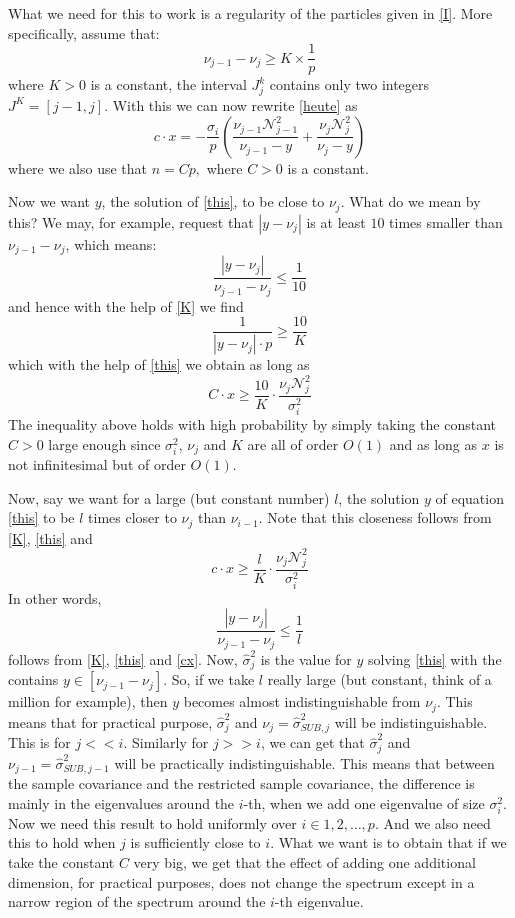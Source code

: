 \documentclass[12pt]{amsart}
\theoremstyle{definition}
\numberwithin{equation}{section}
\numberwithin{equation}{section}
\theoremstyle{remark}
\numberwithin{equation}{section}
\begin{document}
What we need for this to work is a regularity of the particles given in \ref{I}. More specifically, assume that:
\begin{equation}
\label{K}
\nu_{j-1}-\nu_{j}\geq K\times\frac{1}{p}
\end{equation}
where $K>0$ is a constant, the interval $J^k_j$ contains only two integers
$J^K=[j-1,j]$. With this we can now rewrite \ref{heute}
as
\begin{equation}
\label{this}
c \cdot x=-
\frac{\sigma_i}{p} \left( \frac{\nu_{j-1}\mathcal{N}^2_{j-1}}{\nu_{j-1}-y}+\frac{\nu_{j}\mathcal{N}^2_{j}}{\nu_{j}-y}\right)
\end{equation}
where we also use that $n=C\dot p,$ where $C>0$ is a constant.

Now we want $y$, the solution of \ref{this}, to be close to $\nu_j$.
What do we mean by this? We may, for example, request that
$|y-\nu_j| $ is at least $10$  times smaller than $\nu_{j-1}-\nu_j$, which means:
$$\frac{|y-\nu_j|}{\nu_{j-1}-\nu_j}\leq  \frac{1}{10}$$
and hence with the help of \ref{K} we find
$$\frac{1}{|y-\nu_j|\cdot p}\geq  \frac{10}{K}$$
which with the help of \ref{this} we obtain
as long as
$$C\cdot x \geq \frac{10}{K}\cdot \frac{\nu_{j}\mathcal{N}^2_{j}}{\sigma_i^2}$$
The inequality above holds with high probability by simply taking the constant $C>0$ large enough since $\sigma_i^2$, $\nu_j$ and $K$ are all of order $O(1)$ and as long as $x$ is not infinitesimal but of order $O(1)$.

Now, say we want for a large (but constant number) $l$, the solution $y$ of equation \ref{this} to be $l$ times closer to $\nu_j$ than $\nu_{i-1}$. Note that this closeness follows from \ref{K}, \ref{this} and
\begin{equation}
\label{cx}
c\cdot x \geq \frac{l}{K}\cdot \frac{\nu_{j}\mathcal{N}^2_{j}}{\sigma_i^2}
\end{equation}
In other words,
\begin{equation}
\label{l}
\frac{|y-\nu_j|}{\nu_{j-1}-\nu_j}\leq  \frac{1}{l}
\end{equation} follows from
\ref{K}, \ref{this} and \ref{cx}. Now, $\hat{\sigma}^2_j$ is the value for $y$ solving
\ref{this} with the contains $y\in[\nu_{j-1}-\nu_j]$. So, if we take $l$ really large (but constant, think
of a million for example), then $y$ becomes almost indistinguishable from $\nu_j$. This means that for practical purpose, $\hat{\sigma}^2_j$ and $\nu_j=\hat{\sigma}^2_{SUB,j}$ will be indistinguishable. This is for $j<<i$.  Similarly for $j>>i$, we can get that $\hat{\sigma}^2_j$ and $\nu_{j-1}=\hat{\sigma}^2_{SUB,j-1}$ will be practically indistinguishable. This means that between the sample covariance and the restricted sample covariance, the difference is mainly in the eigenvalues around the $i$-th, when we add one eigenvalue of size $\sigma_i^2$. Now we need this result to hold uniformly over $i \in 1,2,\ldots,p$. And we
also need this to hold when $j$ is sufficiently close to $i$. What we want is to obtain that if we take the constant $C$ very big, we get that the effect of adding one additional dimension, for practical purposes, does not change the spectrum except in a narrow region of the spectrum around the $i$-th eigenvalue.
\end{document}
